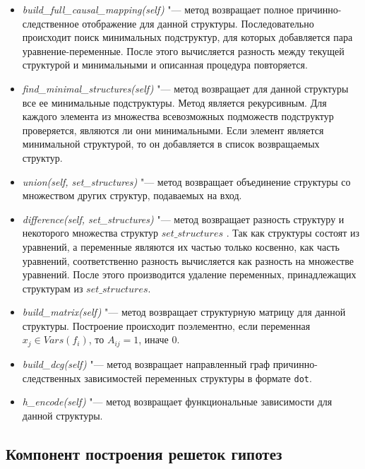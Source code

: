 \begin{itemize}
    \item \textit{build\_full\_causal\_mapping(self)} "--- метод возвращает полное причинно-следственное отображение 
            для данной структуры. Последовательно происходит поиск минимальных подструктур, для которых добавляется 
            пара уравнение-переменные. После этого вычисляется разность между текущей структурой и минимальными и 
            описанная процедура повторяется.
    \item \textit{find\_minimal\_structures(self) } "--- метод возвращает для данной структуры все ее 
            минимальные подструктуры. Метод является рекурсивным. Для каждого элемента из множества всевозможных 
            подможеств подструктур проверяется, являются ли они минимальными. Если элемент является минимальной 
            структурой, то он добавляется в список возвращаемых структур.
    \item \textit{union(self, set\_structures)} "--- метод возвращает объединение структуры со множеством других 
            структур, подаваемых на вход. 
    \item \textit{difference(self, set\_structures)} "--- метод возвращает разность структуру и некоторого 
            множества структур $set\_structures$ . Так как структуры состоят из уравнений, а переменные являются 
            их частью только косвенно, как часть уравнений, соответственно разность вычисляется как разность на 
            множестве уравнений. После этого производится удаление переменных, принадлежащих 
            структурам из $set\_structures$.

    \item \textit{build\_matrix(self)} "--- метод возвращает структурную матрицу для данной структуры. 
            Построение происходит поэлементно, если переменная $x_j \in Vars(f_i)$, то $A_{ij} = 1$, иначе $0$.
    \item \textit{build\_dcg(self)} "--- метод возвращает направленный граф причинно-следственных зависимостей 
            переменных структуры в формате \texttt{dot}. 
    \item \textit{h\_encode(self)} "--- метод возвращает функциональные зависимости для данной структуры.

\end{itemize}



\subsection{Компонент построения решеток гипотез}\label{sect_4_2_3}

